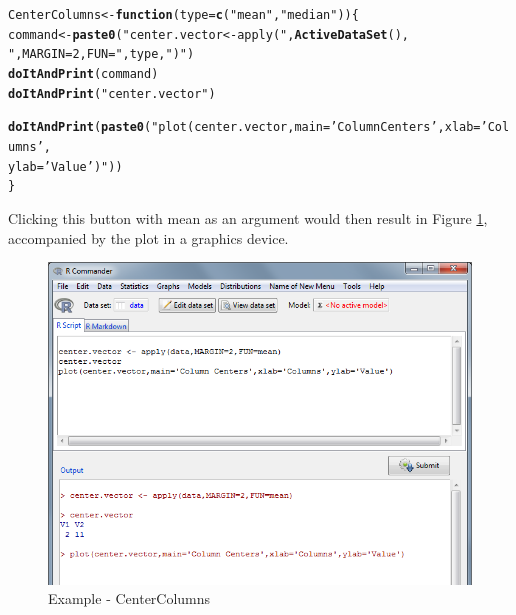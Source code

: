 \documentclass[a4paper]{article}\usepackage[]{graphicx}\usepackage[]{color}
\makeatletter
\newcommand{\hlstr}[1]{\textcolor[rgb]{0.192,0.494,0.8}{#1}}%
\newcommand{\hlstd}[1]{\textcolor[rgb]{0.345,0.345,0.345}{#1}}%
\newcommand{\hlkwa}[1]{\textcolor[rgb]{0.161,0.373,0.58}{\textbf{#1}}}%
\newcommand{\hlkwb}[1]{\textcolor[rgb]{0.69,0.353,0.396}{#1}}%
\newcommand{\hlkwc}[1]{\textcolor[rgb]{0.333,0.667,0.333}{#1}}%
\newcommand{\hlkwd}[1]{\textcolor[rgb]{0.737,0.353,0.396}{\textbf{#1}}}%
\newenvironment{kframe}{%
 \def\at@end@of@kframe{}%
 \ifinner\ifhmode%
  \def\at@end@of@kframe{\end{minipage}}%
  \begin{minipage}{\columnwidth}%
 \fi\fi%
 \def\FrameCommand##1{\hskip\@totalleftmargin \hskip-\fboxsep
 \colorbox{shadecolor}{##1}\hskip-\fboxsep
     \hskip-\linewidth \hskip-\@totalleftmargin \hskip\columnwidth}%
 \MakeFramed {\advance\hsize-\width
   \@totalleftmargin\z@ \linewidth\hsize
   \@setminipage}}%
 {\par\unskip\endMakeFramed%
 \at@end@of@kframe}
\newenvironment{knitrout}{}{} %
\makeatother
\begin{document}
\begin{knitrout}
\color{fgcolor}\begin{kframe}
\begin{alltt}
\hlstd{CenterColumns} \hlkwb{<-} \hlkwa{function}\hlstd{(}\hlkwc{type}\hlstd{=}\hlkwd{c}\hlstd{(}\hlstr{"mean"}\hlstd{,}\hlstr{"median"}\hlstd{))\{}
        \hlstd{command} \hlkwb{<-} \hlkwd{paste0}\hlstd{(}\hlstr{"center.vector <- apply("}\hlstd{,}\hlkwd{ActiveDataSet}\hlstd{(),}
                                       \hlstr{",MARGIN=2,FUN="}\hlstd{,type,}\hlstr{")"}\hlstd{)}
        \hlkwd{doItAndPrint}\hlstd{(command)}
        \hlkwd{doItAndPrint}\hlstd{(}\hlstr{"center.vector"}\hlstd{)}

        \hlkwd{doItAndPrint}\hlstd{(}\hlkwd{paste0}\hlstd{(}\hlstr{"plot(center.vector,main='Column Centers',xlab='Columns',
                               ylab='Value')"}\hlstd{))}
\hlstd{\}}
\end{alltt}
\end{kframe}
\end{knitrout}
\noindent Clicking this button with mean as an argument would then result in
Figure \ref{doitandprint_example}, accompanied by the plot in a graphics device.
\begin{figure}[H]
\centering
\includegraphics[width=12cm]{figures/doitandprint_example.png}
\caption{Example - CenterColumns \label{doitandprint_example}}
\end{figure}
\end{document}
